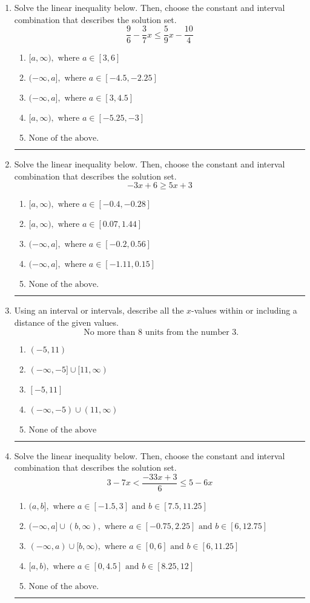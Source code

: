 \documentclass[14pt]{extbook}
\newcommand{\litem}[1]{\item#1\hspace*{-1cm}\rule{\textwidth}{0.4pt}}
\begin{document}
\begin{enumerate}
\litem{
Solve the linear inequality below. Then, choose the constant and interval combination that describes the solution set.\[ \frac{9}{6} - \frac{3}{7} x \leq \frac{5}{9} x - \frac{10}{4} \]\begin{enumerate}[label=\Alph*.]
\item \( [a, \infty), \text{ where } a \in [3, 6] \)
\item \( (-\infty, a], \text{ where } a \in [-4.5, -2.25] \)
\item \( (-\infty, a], \text{ where } a \in [3, 4.5] \)
\item \( [a, \infty), \text{ where } a \in [-5.25, -3] \)
\item \( \text{None of the above}. \)

\end{enumerate} }
\litem{
Solve the linear inequality below. Then, choose the constant and interval combination that describes the solution set.\[ -3x + 6 \geq 5x + 3 \]\begin{enumerate}[label=\Alph*.]
\item \( [a, \infty), \text{ where } a \in [-0.4, -0.28] \)
\item \( [a, \infty), \text{ where } a \in [0.07, 1.44] \)
\item \( (-\infty, a], \text{ where } a \in [-0.2, 0.56] \)
\item \( (-\infty, a], \text{ where } a \in [-1.11, 0.15] \)
\item \( \text{None of the above}. \)

\end{enumerate} }
\litem{
Using an interval or intervals, describe all the $x$-values within or including a distance of the given values.\[ \text{ No more than } 8 \text{ units from the number } 3. \]\begin{enumerate}[label=\Alph*.]
\item \( (-5, 11) \)
\item \( (-\infty, -5] \cup [11, \infty) \)
\item \( [-5, 11] \)
\item \( (-\infty, -5) \cup (11, \infty) \)
\item \( \text{None of the above} \)

\end{enumerate} }
\litem{
Solve the linear inequality below. Then, choose the constant and interval combination that describes the solution set.\[ 3 - 7 x < \frac{-33 x + 3}{6} \leq 5 - 6 x \]\begin{enumerate}[label=\Alph*.]
\item \( (a, b], \text{ where } a \in [-1.5, 3] \text{ and } b \in [7.5, 11.25] \)
\item \( (-\infty, a] \cup (b, \infty), \text{ where } a \in [-0.75, 2.25] \text{ and } b \in [6, 12.75] \)
\item \( (-\infty, a) \cup [b, \infty), \text{ where } a \in [0, 6] \text{ and } b \in [6, 11.25] \)
\item \( [a, b), \text{ where } a \in [0, 4.5] \text{ and } b \in [8.25, 12] \)
\item \( \text{None of the above.} \)


\end{enumerate}}
\end{enumerate}
\end{document}
